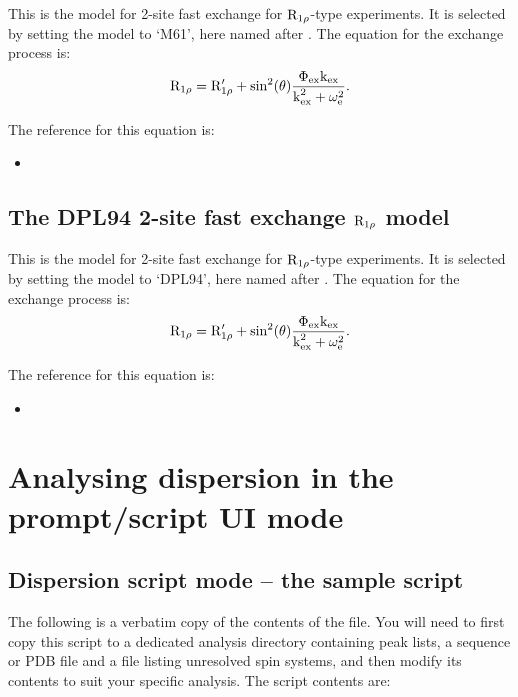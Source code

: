 This is the model for 2-site fast exchange for $\mathrm{R}_{1\rho}$-type experiments.  It is selected by setting the model to `M61', here named after \citet{Meiboom61}.  The equation for the exchange process is:
\begin{equation}
    \mathrm{R}_{1\rho} = \mathrm{R}_{1\rho}' + \sin^2(\theta) \frac{\Phi_\textrm{ex}\textrm{k}_\textrm{ex}}{\textrm{k}_\textrm{ex}^2 + \omega_\textrm{e}^2} .
\end{equation}

The reference for this equation is:
\begin{itemize}
\item {}
\end{itemize}



\subsection{The DPL94 2-site fast exchange $\mathrm{R}_{1\rho}$ model}

This is the model for 2-site fast exchange for $\mathrm{R}_{1\rho}$-type experiments.  It is selected by setting the model to `DPL94', here named after \citet{Davis94}.  The equation for the exchange process is:
\begin{equation}
    \mathrm{R}_{1\rho} = \mathrm{R}_{1\rho}' + \sin^2(\theta) \frac{\Phi_\textrm{ex}\textrm{k}_\textrm{ex}}{\textrm{k}_\textrm{ex}^2 + \omega_\textrm{e}^2} .
\end{equation}

The reference for this equation is:
\begin{itemize}
\item {}
\end{itemize}



\section{Analysing dispersion in the prompt/script UI mode}



\subsection{Dispersion script mode -- the sample script}

The following is a verbatim copy of the contents of the  file.
You will need to first copy this script to a dedicated analysis directory containing peak lists, a sequence or PDB file and a file listing unresolved spin systems, and then modify its contents to suit your specific analysis.
The script contents are:

